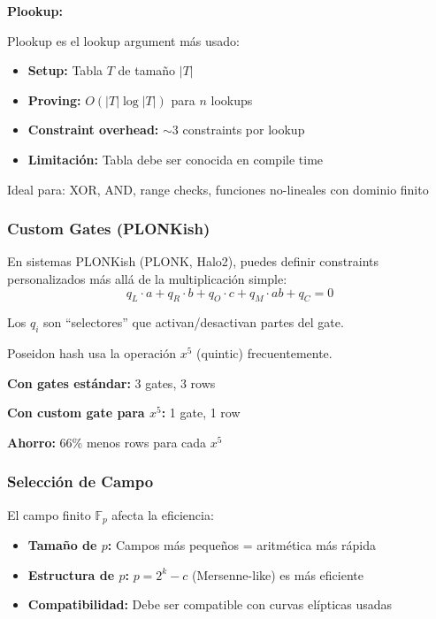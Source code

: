 \documentclass[11pt,a4paper,twoside]{book}
\begin{document}
\begin{mathnote}
\textbf{Plookup:}

Plookup es el lookup argument m\'as usado:
\begin{itemize}
    \item \textbf{Setup:} Tabla $T$ de tama\~no $|T|$
    \item \textbf{Proving:} $O(|T| \log |T|)$ para $n$ lookups
    \item \textbf{Constraint overhead:} $\sim$3 constraints por lookup
    \item \textbf{Limitaci\'on:} Tabla debe ser conocida en compile time
\end{itemize}

Ideal para: XOR, AND, range checks, funciones no-lineales con dominio finito
\end{mathnote}

\subsubsection{Custom Gates (PLONKish)}

\begin{definition}
En sistemas PLONKish (PLONK, Halo2), puedes definir constraints personalizados m\'as all\'a de la multiplicaci\'on simple:
\[
q_L \cdot a + q_R \cdot b + q_O \cdot c + q_M \cdot ab + q_C = 0
\]

Los $q_i$ son ``selectores'' que activan/desactivan partes del gate.
\end{definition}

\begin{example}
Poseidon hash usa la operaci\'on $x^5$ (quintic) frecuentemente.

\textbf{Con gates est\'andar:} 3 gates, 3 rows

\textbf{Con custom gate para $x^5$:} 1 gate, 1 row

\textbf{Ahorro:} 66\% menos rows para cada $x^5$
\end{example}

\subsubsection{Selecci\'on de Campo}

\begin{definition}
El campo finito $\mathbb{F}_p$ afecta la eficiencia:
\begin{itemize}
    \item \textbf{Tama\~no de $p$:} Campos m\'as peque\~nos = aritm\'etica m\'as r\'apida
    \item \textbf{Estructura de $p$:} $p = 2^k - c$ (Mersenne-like) es m\'as eficiente
    \item \textbf{Compatibilidad:} Debe ser compatible con curvas el\'ipticas usadas
\end{itemize}
\end{definition}
\end{document}
